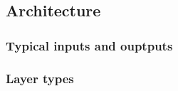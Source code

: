 \subsection{Architecture}
	\subsubsection{Typical inputs and ouptputs}
	\subsubsection{Layer types}
